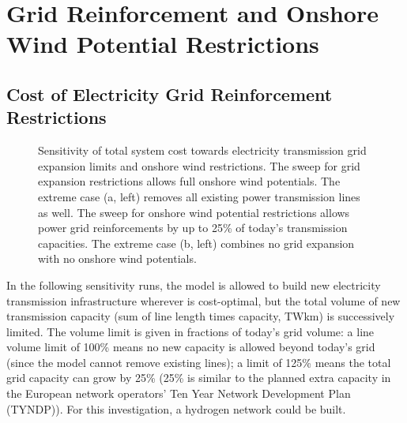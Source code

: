 \section{Grid Reinforcement and Onshore Wind Potential Restrictions}
\label{sec:si:sensitivity-lv-onw}

\subsection{Cost of Electricity Grid Reinforcement Restrictions}
\label{sec:si:lv}

\begin{figure}
    \centering
    \caption{Sensitivity of total system cost towards electricity transmission grid expansion limits and onshore wind restrictions.
    The sweep for grid expansion restrictions allows full onshore wind potentials.
    The extreme case (a, left) removes all existing power transmission lines as well.
    The sweep for onshore wind potential restrictions allows power grid reinforcements by up to 25\% of today's transmission capacities.
    The extreme case (b, left) combines no grid expansion with no onshore wind potentials.}

    \label{fig:lv-onw-restriction}
\end{figure}

In the following sensitivity runs, the model is allowed to build new electricity
transmission infrastructure wherever is cost-optimal, but the total volume of
new transmission capacity (sum of line length times capacity, TWkm) is
successively limited. The volume limit is given in fractions of today's grid
volume: a line volume limit of 100\% means no new capacity is allowed beyond
today's grid (since the model cannot remove existing lines); a limit of 125\%
means the total grid capacity can grow by 25\% (25\% is similar to the planned
extra capacity in the European network operators' Ten Year Network Development
Plan (TYNDP)). For this investigation, a hydrogen network
could be built.

